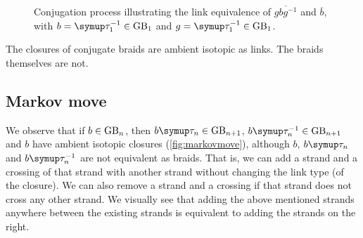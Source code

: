 \begin{figure}[H]
{}
	\quad\quad{}
	\caption{Conjugation process illustrating the link equivalence of \(\overline{g b g^{-1}}\) and \(\overline{b}\), with \(b = \tauu_1^{-1} \in \GB_1\) and \(g = \tauu_1^{-1} \in \GB_1\).}
	\label{fig:conjugation}
\end{figure}

\begin{remark}
	The closures of conjugate braids are ambient isotopic as links. The braids themselves are not.
\end{remark}

\subsection{Markov move}

We observe that if \(b \in \text{GB}_n\), then \(b \tauu_n \in \GB_{n+1}\), \(b \tauu_n^{-1} \in \GB_{n+1}\) and \(b\) have ambient isotopic closures (\cref{fig:markovmove}), although \(b\), \(b\tauu_n\) and \(b\tauu_n^{-1}\) are not equivalent as braids. That is, we can add a strand and a crossing of that strand with another strand without changing the link type (of the closure). We can also remove a strand and a crossing if that strand does not cross any other strand. We visually see that adding the above mentioned strands anywhere between the existing strands is equivalent to adding the strands on the right.

